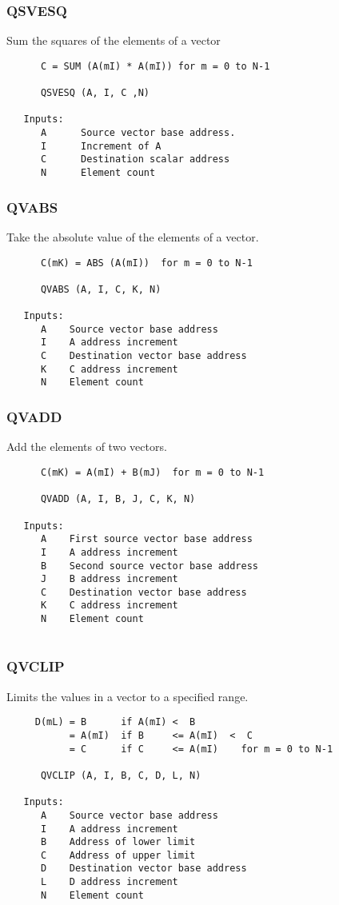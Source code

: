 \subsubsection{QSVESQ }
Sum the squares of the elements of a vector

\begin{verbatim}
      C = SUM (A(mI) * A(mI)) for m = 0 to N-1

      QSVESQ (A, I, C ,N)

   Inputs:
      A      Source vector base address.
      I      Increment of A
      C      Destination scalar address
      N      Element count

\end{verbatim}
\subsubsection{QVABS }
Take the absolute value of the elements of a vector.

\begin{verbatim}
      C(mK) = ABS (A(mI))  for m = 0 to N-1

      QVABS (A, I, C, K, N)

   Inputs:
      A    Source vector base address
      I    A address increment
      C    Destination vector base address
      K    C address increment
      N    Element count

\end{verbatim}
\subsubsection{QVADD }
Add the elements of two vectors.

\begin{verbatim}
      C(mK) = A(mI) + B(mJ)  for m = 0 to N-1

      QVADD (A, I, B, J, C, K, N)

   Inputs:
      A    First source vector base address
      I    A address increment
      B    Second source vector base address
      J    B address increment
      C    Destination vector base address
      K    C address increment
      N    Element count
 

\end{verbatim}
\subsubsection{QVCLIP }
Limits the values in a vector to a specified range.
\begin{verbatim}
     D(mL) = B      if A(mI) <  B
           = A(mI)  if B     <= A(mI)  <  C
           = C      if C     <= A(mI)    for m = 0 to N-1

      QVCLIP (A, I, B, C, D, L, N)

   Inputs:
      A    Source vector base address
      I    A address increment
      B    Address of lower limit
      C    Address of upper limit
      D    Destination vector base address
      L    D address increment
      N    Element count

\end{verbatim}

